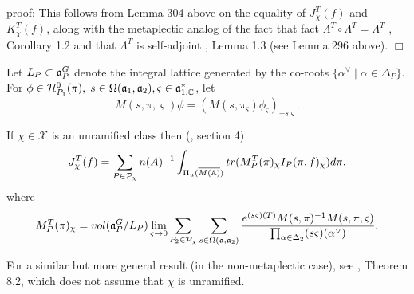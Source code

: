 proof: This follows from Lemma 304 above on the
equality of $J_\chi ^T(f)$ and $K_\chi ^T(f)$, along with the
metaplectic analog of the fact that
fact $\Lambda^T\circ \Lambda ^T=\Lambda ^T$
\cite{A3}, Corollary 1.2 and that $\Lambda ^T$ is
self-adjoint \cite{A3}, Lemma 1.3 (see Lemma 296 above). $\Box $

Let $L_P\subset {{\frak{a}}}_P^G$ denote the integral
lattice generated by the
co-roots $\{\alpha ^{\vee }\;|\;\alpha \in \Delta _P\}$. For $\phi \in 
{\cal{H}}_{P_1}^0(\pi ),
\;s\in \Omega ({{\frak{a}}}_1,{{\frak{a}}}_2),\varsigma
\in {{\frak{a}}}_{1,\Bbb{C}}^{*}$, let 
\[
M(s,\pi ,\varsigma )\phi =(M(s,\pi _\varsigma )\phi _\varsigma
)_{-s\varsigma }. 
\]
\begin{theorem}
If $\chi \in \mathcal{X}$ is an unramified class then (\cite{A3},
section 4) 
\[
J_\chi ^T(f)=\sum_{P\in \mathcal{P}_\chi }
n(A)^{-1}\int_{\Pi _u(\overline{M({\Bbb{A}})})}
tr(M_P^T(\pi )_\chi I_P(\pi ,f)_\chi )d\pi ,
\]
where 
\[
M_P^T(\pi )_\chi =vol({{\frak{a}}}_P^G/L_P)\lim_{\varsigma \rightarrow
0}\sum_{P_2\in \mathcal{P}_\chi }
\sum_{s\in \Omega ({{\frak{a}}},{{\frak{a}}}_2)}
\frac{e^{(s\varsigma )(T)}M(s,\pi )^{-1}M(s,\pi ,\varsigma )}{\prod_{\alpha
\in \Delta _2}(s\varsigma )(\alpha ^{\vee })}.
\]
\end{theorem}

For a similar but more general result (in the non-metaplectic case),
see \cite{A14}, Theorem 8.2,
which does not assume that $\chi$ is unramified.

